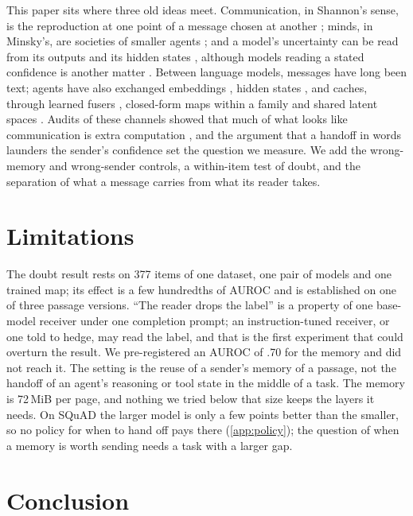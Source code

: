 \documentclass{article}
\begin{document}
This paper sits where three old ideas meet. Communication, in Shannon's sense, is the reproduction at one point of a message chosen at another \citep{shannon1948mathematical}; minds, in Minsky's, are societies of smaller agents \citep{minsky1986society}; and a model's uncertainty can be read from its outputs and its hidden states \citep{farquhar2024detecting,kossen2024sep}, although models reading a stated confidence is another matter \citep{tian2023just,yona2024can}. Between language models, messages have long been text; agents have also exchanged embeddings \citep{2310.06272}, hidden states \citep{2511.09149,2608.13317}, and caches, through learned fusers \citep{2510.03215}, closed-form maps within a family \citep{2608.03893} and shared latent spaces \citep{2601.06123,2606.13594}. Audits of these channels showed that much of what looks like communication is extra computation \citep{2608.04893,2607.26773}, and the argument that a handoff in words launders the sender's confidence \citep{2606.20662} set the question we measure. We add the wrong-memory and wrong-sender controls, a within-item test of doubt, and the separation of what a message carries from what its reader takes.

\section{Limitations}
\label{sec:limitations}

The doubt result rests on 377 items of one dataset, one pair of models and one trained map; its effect is a few hundredths of AUROC and is established on one of three passage versions. ``The reader drops the label'' is a property of one base-model receiver under one completion prompt; an instruction-tuned receiver, or one told to hedge, may read the label, and that is the first experiment that could overturn the result. We pre-registered an AUROC of .70 for the memory and did not reach it. The setting is the reuse of a sender's memory of a passage, not the handoff of an agent's reasoning or tool state in the middle of a task. The memory is 72\,MiB per page, and nothing we tried below that size keeps the layers it needs. On SQuAD the larger model is only a few points better than the smaller, so no policy for when to hand off pays there (\cref{app:policy}); the question of when a memory is worth sending needs a task with a larger gap.

\section{Conclusion}
\label{sec:conclusion}
\end{document}
